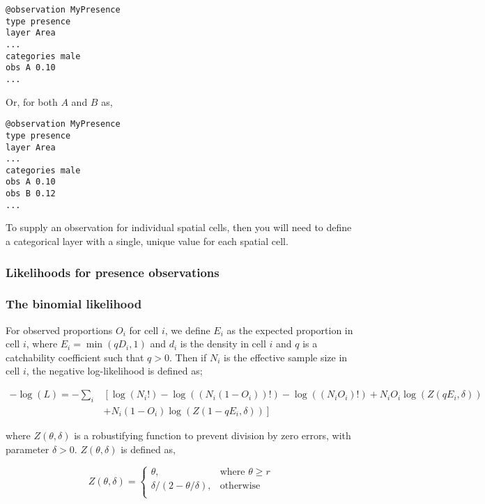 {{{{{{{\small{\begin{verbatim}
@observation MyPresence
type presence
layer Area
...
categories male 
obs A 0.10
...
\end{verbatim}}}

Or, for both $A$ and $B$ as,

{\small{\begin{verbatim}
@observation MyPresence
type presence
layer Area
...
categories male
obs A 0.10
obs B 0.12
...
\end{verbatim}}}

To supply an observation for individual spatial cells, then you will need to define a categorical layer with a single, unique value for each spatial cell. 

\subsubsection{Likelihoods for presence observations}

\subsubsection*{The binomial likelihood}

For observed proportions $O_i$ for cell $i$, we define $E_i$ as the expected proportion in cell $i$, where $E_i = \min(qD_i, 1)$ and $d_i$ is the density in cell $i$ and $q$ is a catchability coefficient such that $q > 0$. Then if $N_i$ is the effective sample size in cell $i$, the negative log-likelihood is defined as;  

\begin{equation}
  \begin{split}
    -\log \left(L \right)= -\sum\limits_i & \left[ \right. \log \left(N_i! \right) - \log \left(\left(N_i \left(1 - O_i \right) \right)! \right) - \log \left(\left(N_i O_i \right)! \right) + N_i O_i \log \left(Z\left(qE_i,\delta \right) \right) \\
    &+ N_i \left(1 - O_i \right)\log \left(Z\left(1 - qE_i,\delta\right) \right) \left. \right]
  \end{split}
\end{equation}


where $Z \left(\theta,\delta \right)$ is a robustifying function to prevent division by zero errors, with parameter $\delta>0$. $Z \left(\theta,\delta \right)$ is defined as,

\begin{equation}
   Z \left(\theta,\delta \right) = \begin{cases}
	  \theta, & \text{where $\theta \ge r$} \\
	  \delta/\left( 2-\theta/\delta \right), & \text{otherwise} \\  
  \end{cases}
\end{equation}

}}}}}}
